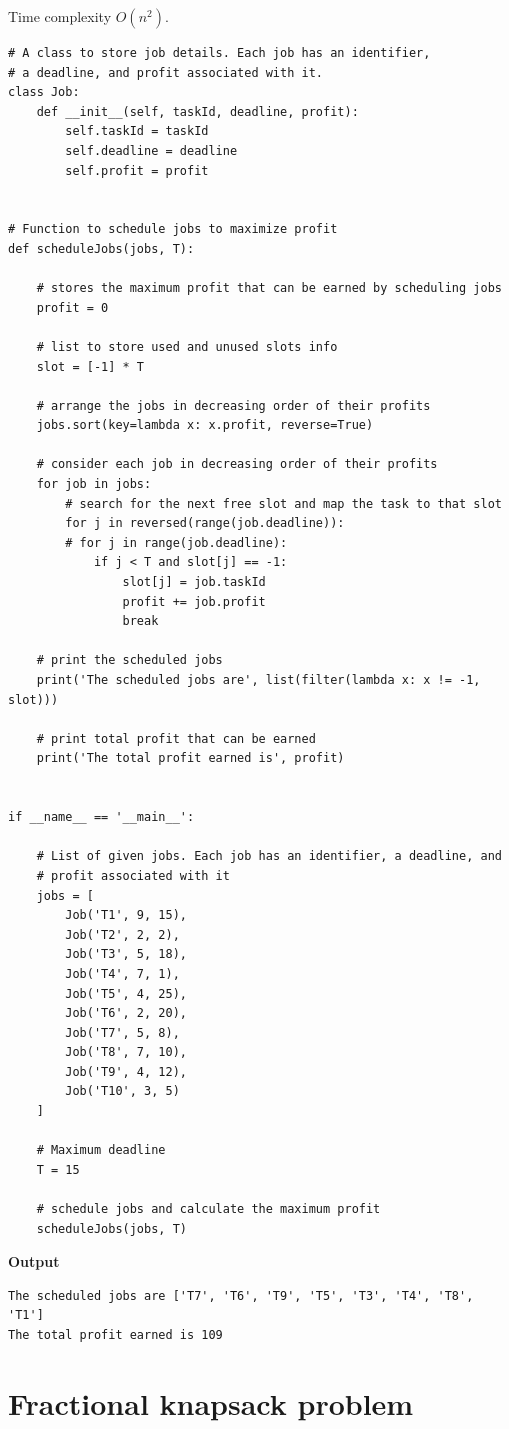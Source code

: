 \documentclass[a4paper,11pt]{book}
\begin{document}
\noindent Time complexity $O(n^2)$.
\begin{lstlisting}
# A class to store job details. Each job has an identifier,
# a deadline, and profit associated with it.
class Job:
    def __init__(self, taskId, deadline, profit):
        self.taskId = taskId
        self.deadline = deadline
        self.profit = profit
 
 
# Function to schedule jobs to maximize profit
def scheduleJobs(jobs, T):
 
    # stores the maximum profit that can be earned by scheduling jobs
    profit = 0
 
    # list to store used and unused slots info
    slot = [-1] * T
 
    # arrange the jobs in decreasing order of their profits
    jobs.sort(key=lambda x: x.profit, reverse=True)
 
    # consider each job in decreasing order of their profits
    for job in jobs:
        # search for the next free slot and map the task to that slot
        for j in reversed(range(job.deadline)):
        # for j in range(job.deadline):
            if j < T and slot[j] == -1:
                slot[j] = job.taskId
                profit += job.profit
                break
 
    # print the scheduled jobs
    print('The scheduled jobs are', list(filter(lambda x: x != -1, slot)))
 
    # print total profit that can be earned
    print('The total profit earned is', profit)
 
 
if __name__ == '__main__':
 
    # List of given jobs. Each job has an identifier, a deadline, and
    # profit associated with it
    jobs = [
        Job('T1', 9, 15), 
        Job('T2', 2, 2), 
        Job('T3', 5, 18), 
        Job('T4', 7, 1), 
        Job('T5', 4, 25),
        Job('T6', 2, 20), 
        Job('T7', 5, 8), 
        Job('T8', 7, 10), 
        Job('T9', 4, 12), 
        Job('T10', 3, 5)
    ]
 
    # Maximum deadline
    T = 15
 
    # schedule jobs and calculate the maximum profit
    scheduleJobs(jobs, T)
\end{lstlisting}
\textbf{Output}
\begin{lstlisting}
The scheduled jobs are ['T7', 'T6', 'T9', 'T5', 'T3', 'T4', 'T8', 'T1']
The total profit earned is 109
\end{lstlisting}

\section{Fractional knapsack problem}
\end{document}
